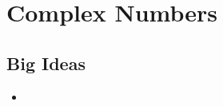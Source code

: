 \chapter{Complex Numbers}
\label{chap:CN}

\section{Big Ideas}
\label{sec:CN Big Ideas}
\begin{itemize}
  \item 
\end{itemize}